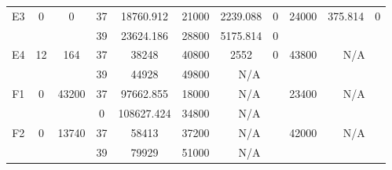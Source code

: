 \begin{sidewaystable}
\begin{tabular}{c||c|c||c|c|c|c|c||c|c|c}
         &
        
      \\
      \hline
      \multirow{2}{*}{E3} &
      \multirow{2}{*}{0} &
      \multirow{2}{*}{0} &
      37 &
      18760.912 &
      21000 &
        2239.088 &
        0 &
      \multirow{2}{*}{24000} &
        \multirow{2}{*}{375.814} &
        \multirow{2}{*}{0}
      \\
      \cline{4-8}
       &
       &
       &
      39 &
      23624.186 &
      28800 &
        5175.814 &
        0 &
      
         &
        
      \\
      \hline
      \multirow{2}{*}{E4} &
      \multirow{2}{*}{12} &
      \multirow{2}{*}{164} &
      37 &
      38248 &
      40800 &
        2552 &
        0 &
      \multirow{2}{*}{43800} &
        \multicolumn{2}{c}{\multirow{2}{*}{N/A}}
      \\
      \cline{4-8}
       &
       &
       &
      39 &
      44928 &
      49800 &
        \multicolumn{2}{|c||}{N/A} &
      
        
      \\
      \hline
      \multirow{2}{*}{F1} &
      \multirow{2}{*}{0} &
      \multirow{2}{*}{43200} &
      37 &
      97662.855 &
      18000 &
        \multicolumn{2}{|c||}{N/A} &
      \multirow{2}{*}{23400} &
        \multicolumn{2}{c}{\multirow{2}{*}{N/A}}
      \\
      \cline{4-8}
       &
       &
       &
      0 &
      108627.424 &
      34800 &
        \multicolumn{2}{|c||}{N/A} &
      
        
      \\
      \hline
      \multirow{2}{*}{F2} &
      \multirow{2}{*}{0} &
      \multirow{2}{*}{13740} &
      37 &
      58413 &
      37200 &
        \multicolumn{2}{|c||}{N/A} &
      \multirow{2}{*}{42000} &
        \multicolumn{2}{c}{\multirow{2}{*}{N/A}}
      \\
      \cline{4-8}
       &
       &
       &
      39 &
      79929 &
      51000 &
        \multicolumn{2}{|c||}{N/A} &
      
        
      \\
\end{tabular}
\label{table:RDS3-10617.tex} 
\end{sidewaystable}